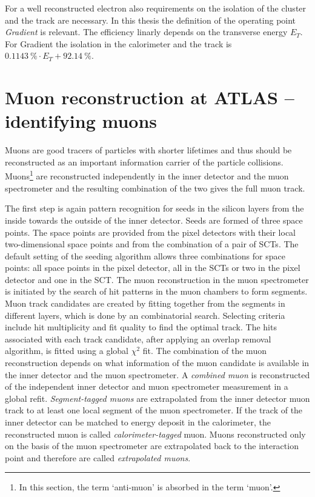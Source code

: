 For a well reconstructed electron also requirements on the isolation of the cluster and the track are necessary. In this thesis the definition of the operating point \textit{Gradient} is relevant. The efficiency linarly depends on the transverse energy $E_T$. For Gradient the isolation in the calorimeter and the track is $\SI{0.1143}{\percent}\cdot E_T+\SI{92.14}{\percent}$. \cite{ePerformance}
%
%
\section{Muon reconstruction at ATLAS -- identifying muons}
Muons are good tracers of particles with shorter lifetimes and thus should be reconstructed as an important information carrier of the particle collisions. Muons\footnote{In this section, the term `anti-muon' is absorbed in the term `muon'.} are reconstructed independently in the inner detector and the muon spectrometer and the resulting combination of the two gives the full muon track. \cite{muPerformance}\par
The first step is again pattern recognition for seeds in the silicon layers from the inside towards the outside of the inner detector. Seeds are formed of three space points. The space points are provided from the pixel detectors with their local two-dimensional space points and from the combination of a pair of SCTs. The default setting of the seeding algorithm allows three combinations for space points: all space points in the pixel detector, all in the SCTs or two in the pixel detector and one in the SCT. \cite{muInner}\newline
The muon reconstruction in the muon spectrometer is initiated by the search of hit patterns in the muon chambers to form segments. Muon track candidates are created by fitting together from the segments in different layers, which is done by an combinatorial search. Selecting criteria include hit multiplicity and fit quality to find the optimal track. The hits associated with each track candidate, after applying an overlap removal algorithm, is fitted using a global $\chi^2$ fit. \cite{muPerformance}\newline
The combination of the muon reconstruction depends on what information of the muon candidate is available in the inner detector and the muon spectrometer. A \textit{combined muon} is reconstructed of the independent inner detector and muon spectrometer measurement in a global refit. \textit{Segment-tagged muons} are extrapolated from the inner detector muon track to at least one local segment of the muon spectrometer. If the track of the inner detector can be matched to energy deposit in the calorimeter, the reconstructed muon is called \textit{calorimeter-tagged} muon. Muons reconstructed only on the basis of the muon spectrometer are extrapolated back to the interaction point and therefore are called \textit{extrapolated muons}.\cite{muPerformance}\newline

